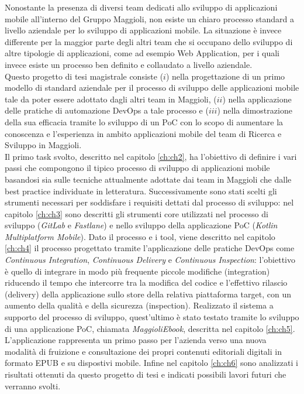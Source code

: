 
\parindent=0pt
Nonostante la presenza di diversi team dedicati allo sviluppo di applicazioni mobile all'interno del Gruppo Maggioli, non esiste un chiaro processo standard a livello aziendale per lo sviluppo di applicazioni mobile. La situazione è invece differente per la maggior parte degli altri team che si occupano dello sviluppo di altre tipologie di applicazioni, come ad esempio Web Application, per i quali invece esiste un processo ben definito e collaudato a livello aziendale.\\
Questo progetto di tesi magistrale consiste ($i$) nella progettazione di un primo modello di standard aziendale per il processo di sviluppo delle applicazioni mobile tale da poter essere adottato dagli altri team in Maggioli, ($ii$) nella applicazione delle pratiche di automazione DevOps a tale processo e ($iii$) nella dimostrazione della sua efficacia tramite lo sviluppo di un PoC con lo scopo di aumentare la conoscenza e l'esperienza in ambito applicazioni mobile del team di Ricerca e Sviluppo in Maggioli.\\
Il primo task svolto, descritto nel capitolo \ref{ch:ch2}, ha l'obiettivo di definire i vari passi che compongono il tipico processo di sviluppo di applicazioni mobile basandosi sia sulle tecniche attualmente adottate dai team in Maggioli che dalle best practice individuate in letteratura. Successivamente sono stati scelti gli strumenti necessari per soddisfare i requisiti dettati dal processo di sviluppo: nel capitolo \ref{ch:ch3} sono descritti gli strumenti core utilizzati nel processo di sviluppo (\textit{GitLab} e \textit{Fastlane}) e nello sviluppo della applicazione PoC (\textit{Kotlin Multiplatform Mobile}). Dato il processo e i tool, viene descritto nel capitolo \ref{ch:ch4} il processo progettato tramite l'applicazione delle pratiche DevOps come \textit{Continuous Integration}, \textit{Continuous Delivery} e \textit{Continuous Inspection}: l'obiettivo è quello di integrare in modo più frequente piccole modifiche (integration) riducendo il tempo che intercorre tra la modifica del codice e l'effettivo rilascio (delivery) della applicazione sullo store della relativa piattaforma target, con un aumento della qualità e della sicurezza (inspection). Realizzato il sistema a supporto del processo di sviluppo, quest'ultimo è stato testato tramite lo sviluppo di una applicazione PoC, chiamata \textit{MaggioliEbook}, descritta nel capitolo \ref{ch:ch5}. L'applicazione rappresenta un primo passo per l'azienda verso una nuova modalità di fruizione e consultazione dei propri contenuti editoriali digitali in formato EPUB e su dispostivi mobile. Infine nel capitolo \ref{ch:ch6} sono analizzati i risultati ottenuti da questo progetto di tesi e indicati possibili lavori futuri che verranno svolti.
